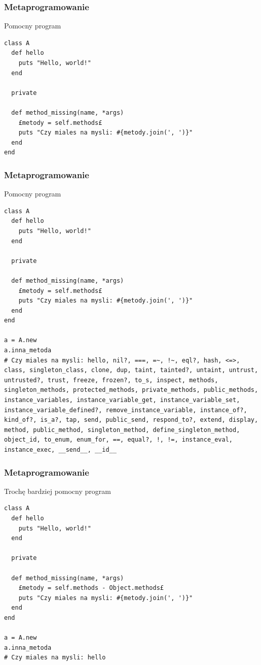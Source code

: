 \begin{frame}[fragile]
\frametitle{Metaprogramowanie}
\begin{block}{Pomocny program}
\begin{lstlisting}[style=Ruby]
class A
  def hello
    puts "Hello, world!"
  end

  private

  def method_missing(name, *args)
    £metody = self.methods£
    puts "Czy miales na mysli: #{metody.join(', ')}"
  end
end
\end{lstlisting}
\end{block}
\end{frame}
\begin{frame}[fragile]
\frametitle{Metaprogramowanie}
\begin{block}{Pomocny program}
\begin{lstlisting}[style=Ruby,basicstyle=\tiny\ttfamily]
class A
  def hello
    puts "Hello, world!"
  end

  private

  def method_missing(name, *args)
    £metody = self.methods£
    puts "Czy miales na mysli: #{metody.join(', ')}"
  end
end

a = A.new
a.inna_metoda
# Czy miales na mysli: hello, nil?, ===, =~, !~, eql?, hash, <=>, class, singleton_class, clone, dup, taint, tainted?, untaint, untrust, untrusted?, trust, freeze, frozen?, to_s, inspect, methods, singleton_methods, protected_methods, private_methods, public_methods, instance_variables, instance_variable_get, instance_variable_set, instance_variable_defined?, remove_instance_variable, instance_of?, kind_of?, is_a?, tap, send, public_send, respond_to?, extend, display, method, public_method, singleton_method, define_singleton_method, object_id, to_enum, enum_for, ==, equal?, !, !=, instance_eval, instance_exec, __send__, __id__
\end{lstlisting}
\end{block}
\end{frame}
\begin{frame}[fragile]
\frametitle{Metaprogramowanie}
\begin{block}{Trochę bardziej pomocny program}
\begin{lstlisting}[style=Ruby,basicstyle=\tiny\ttfamily]
class A
  def hello
    puts "Hello, world!"
  end

  private

  def method_missing(name, *args)
    £metody = self.methods - Object.methods£
    puts "Czy miales na mysli: #{metody.join(', ')}"
  end
end

a = A.new
a.inna_metoda
# Czy miales na mysli: hello
\end{lstlisting}
\end{block}
\end{frame}

